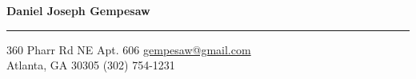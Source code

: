 \newcommand{\myauthor}[1] {
  \begin{center}
    \Large
    \textbf{#1}
  \end{center}
  \hrule
  \vspace{0.2 cm}
  \normalsize}
%
\newcommand{\contact}[4] {
  #1 \hfill \href{mailto:#3}{#3}\\
  #2 \hfill #4\\
\vspace{-.60 cm}
}
%
\myauthor{Daniel Joseph Gempesaw}
\contact{360 Pharr Rd NE Apt. 606}
        {Atlanta, GA 30305}
        {gempesaw@gmail.com}
        {(302) 754-1231}
